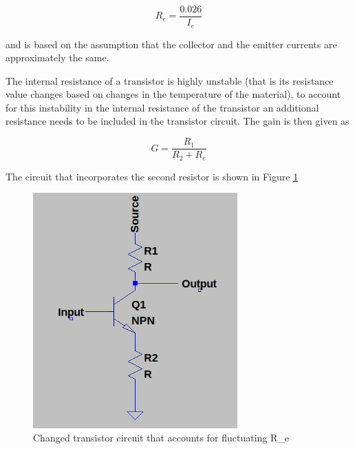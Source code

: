 \documentclass[12pt, a4paper]{article}
\begin{document}
 	\begin{equation}
 		R_e = \frac{0.026}{I_e}
 	\end{equation}

 	and is based on the assumption that the collector and the emitter currents are approximately the same.

 	The internal resistance of a transistor is highly unstable (that is its resistance value changes based on changes in the temperature of the material), to account for this instability in the internal resistance of the transistor an additional resistance needs to be included in the transistor circuit. The gain is then given as 

 	\begin{equation}
 		G = \frac{R_1}{R_2 + R_e}
 	\end{equation} 

 	The circuit that incorporates the second resistor is shown in Figure \ref{fig:transistor_configuration_circuit_added_R2}

 	\begin{figure}
 		\centering
		\label{fig:transistor_configuration_circuit_added_R2}
		\includegraphics[width=0.7\textwidth]{images/transistor_configuration_circuit_added_R2.png}
		\caption{Changed transistor circuit that accounts for fluctuating R_e}
 	\end{figure}
\end{document}

